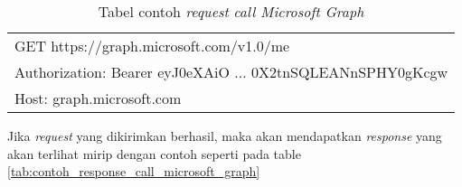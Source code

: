 \documentclass[a4paper,twoside]{article}
\begin{document}
\begin{enumerate}
\begin{table}[H]
	\centering 
	\caption{Tabel contoh \textit{request} \textit{call Microsoft Graph}}
	\label{tab:contoh_request_call_microsoft_graph}
	\begin{tabular}{|p{9cm}|}
	\hline
	GET https://graph.microsoft.com/v1.0/me \\
Authorization: Bearer eyJ0eXAiO ... 0X2tnSQLEANnSPHY0gKcgw\\
Host: graph.microsoft.com \\
	\hline
	\end{tabular}  
\end{table}

Jika \textit{request} yang dikirimkan berhasil, maka akan mendapatkan \textit{response} yang akan terlihat mirip dengan contoh seperti pada table \ref{tab:contoh_response_call_microsoft_graph}


\end{enumerate}
\end{document}
